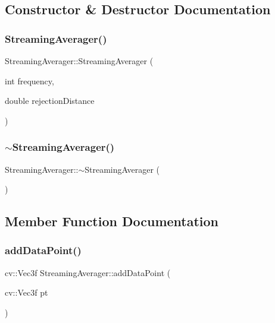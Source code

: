 \subsection{Constructor \& Destructor Documentation}
\hypertarget{class_streaming_averager_a10619c9e194b1214153fcdf9c393136c}{}\label{class_streaming_averager_a10619c9e194b1214153fcdf9c393136c} 
\subsubsection{\texorpdfstring{Streaming\+Averager()}{StreamingAverager()}}
{\footnotesize\ttfamily Streaming\+Averager\+::\+Streaming\+Averager (\begin{DoxyParamCaption}\item[{int}]{frequency,  }\item[{double}]{rejection\+Distance }\end{DoxyParamCaption})}

\hypertarget{class_streaming_averager_a1b792331aa3d870fbddb7e50b18db35e}{}\label{class_streaming_averager_a1b792331aa3d870fbddb7e50b18db35e} 
\subsubsection{\texorpdfstring{$\sim$\+Streaming\+Averager()}{~StreamingAverager()}}
{\footnotesize\ttfamily Streaming\+Averager\+::$\sim$\+Streaming\+Averager (\begin{DoxyParamCaption}{ }\end{DoxyParamCaption})}



\subsection{Member Function Documentation}
\hypertarget{class_streaming_averager_a238462f19f093dbb109cb91128d0d2f7}{}\label{class_streaming_averager_a238462f19f093dbb109cb91128d0d2f7} 
\subsubsection{\texorpdfstring{add\+Data\+Point()}{addDataPoint()}}
{\footnotesize\ttfamily cv\+::\+Vec3f Streaming\+Averager\+::add\+Data\+Point (\begin{DoxyParamCaption}\item[{cv\+::\+Vec3f}]{pt }\end{DoxyParamCaption})}


